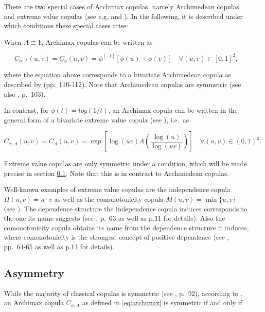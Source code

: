\documentclass[
]{krantz}
\begin{document}
There are two special cases of Archimax copulas, namely Archimedean copulas and extreme value copulas (see e.g. \citet{caperaa2000} and \citet{durante2010b}). In the following, it is described under which conditions these special cases arise:

When \(A \equiv 1\), Archimax copulas can be written as

\begin{equation}
C_{\phi, A}(u, v) = C_{\phi}(u, v) = \phi^{[-1]}\left[\phi(u) + \phi(v) \right] \quad \forall (u,v) \in [0,1]^2,
\label{eq:archimedan}
\end{equation}

where the equation above corresponds to a bivariate Archimedean copula as described by \citet{nelsen2006} (pp.~110-112). Note that Archimedean copulas are symmetric (see also \citet{genest2013}, p.~103).

In contrast, for \(\phi(t)=log(1/t)\), an Archimax copula can be written in the general form of a bivariate extreme value copula (see \citet{durante2010b}), i.e.~as

\begin{equation}
C_{\phi, A}(u, v) = C_A(u, v) = \exp\left[ \log(uv) A\left( \frac{\log(u)}{\log(uv)} \right) \right] \quad \forall (u, v) \in (0,1)^2.
\label{eq:extreme}
\end{equation}

Extreme value copulas are only symmetric under a condition, which will be made precise in section \ref{asymarchi}. Note that this is in contrast to Archimedean copulas.

Well-known examples of extreme value copulas are the independence copula \(\Pi(u, v) = u \cdot v\) as well as the comonotonicity copula \(M(u, v) = \min\{u, v\}\) (see \citet{durante2010b}). The dependence structure the independence copula induces corresponds to the one its name suggests (see \citet{durante2016}, p.~63 as well as p.11 for details). Also the comonotonicity copula obtains its name from the dependence structure it induces, where comonotonicity is the strongest concept of positive dependence (see \citet{durante2016}, pp.~64-65 as well as p.11 for details).

\subsection{Asymmetry}\label{asymarchi}

While the majority of classical copulas is symmetric (see \citet{genest2013}, p.~92), according to \citet{bacigal2011}, an Archimax copula \(C_{\phi, A}\) as defined in \eqref{eq:archimax} is symmetric if and only if
\end{document}
